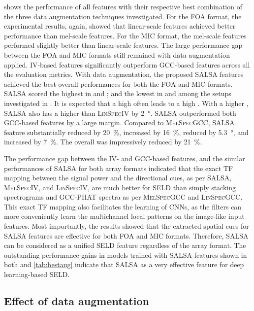 \documentclass[journal]{IEEEtran}
\newcommand{\ER}{\xspace}
\newcommand{\Fone}{\xspace}
\newcommand{\LE}{\xspace}
\newcommand{\LR}{\xspace}
\newcommand{\Eseld}{\xspace}
\begin{document}
 shows the performance of all features with their respective best combination of the three data augmentation techniques investigated. For the FOA format, the experimental results, again, showed that linear-scale features achieved better performance than mel-scale features. For the MIC format, the mel-scale features performed slightly better than linear-scale features. The large performance gap between the FOA and MIC formats still remained with data augmentation applied. IV-based features significantly outperform GCC-based features across all the evaluation metrics. With data augmentation, the proposed SALSA features achieved the best overall performances for both the FOA and MIC formats. SALSA scored the highest in \Fone and \LR; and the lowest in \ER and \Eseld among the setups investigated in \protect{}. It is expected that a high \LR often leads to a high \LE. With a higher \LR, SALSA also has a higher \LE than \textsc{LinSpecIV} by \SI{2}{\degree}. SALSA outperformed both GCC-based features by a large margin. Compared to \textsc{MelSpecGCC}, SALSA feature substantially reduced \ER by \SI{20}{\percent}, increased \Fone by \SI{16}{\percent}, reduced \LE by \SI{5.3}{\degree}, and increased \LR by \SI{7}{\percent}. The overall \Eseld was impressively reduced by \SI{21}{\percent}. 

The performance gap between the IV- and GCC-based features, and the similar performances of SALSA for both array formats indicated that the exact TF mapping between the signal power and the directional cues, as per SALSA, \textsc{MelSpecIV}, and \textsc{LinSpecIV}, are much better for SELD than simply stacking spectrograms and GCC-PHAT spectra as per \textsc{MelSpecGCC} and \textsc{LinSpecGCC}. This exact TF mapping also facilitates the learning of CNNs, as the filters can more conveniently learn the multichannel local patterns on the image-like input features. Most importantly, the results showed that the extracted spatial cues for SALSA features are effective for both FOA and MIC formats. 
Therefore, SALSA can be considered as a unified SELD feature regardless of the array format. The outstanding performance gains in models trained with SALSA features shown in both  and \ref{tab:bestaug} indicate that SALSA as a very effective feature for deep learning-based SELD. 

\subsection{Effect of data augmentation}
\end{document}
